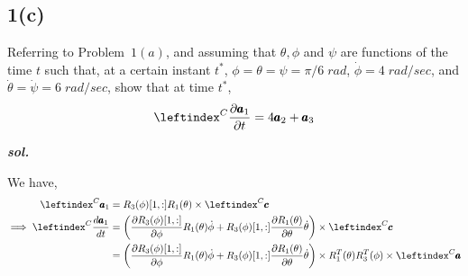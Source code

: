 \subsection{1(c)}
Referring to Problem~$1(a)$, and assuming that $\theta, \phi$ and $\psi$ are functions of the time $t$ such that, at a certain instant $t^*$, $\phi = \theta = \psi = \pi/6 \; rad$, $\dot \phi = 4 \; rad/sec$, and $\dot \theta = \dot \psi = 6 \; rad/sec$, show that at time $t^*$,
$$ \lx{^C}{\frac{\partial \pmb a_1}{\partial t}} = 4 \pmb a_2 + \pmb a_3$$

\textbf{\textit{sol.}}

We have,
\begin{align*}
    \lx{^C}{{\pmb a_1}} &= R_3(\phi)[1, :] R_1(\theta) \times \lx{^C}{\pmb c}\\
    \implies \lx{^C}{\frac{d \pmb a_1}{dt}} &= \left( \frac{\partial R_3(\phi)[1, :]}{\partial \phi}   R_1(\theta) \dot \phi + R_3(\phi)[1, :] \frac{\partial R_1(\theta)}{\partial \theta } \dot \theta \right) \times \lx{^C}{\pmb c}\\
    &= \left( \frac{\partial R_3(\phi)[1, :]}{\partial \phi}   R_1(\theta) \dot \phi + R_3(\phi)[1, :] \frac{\partial R_1(\theta)}{\partial \theta } \dot \theta \right) \times R_1^T(\theta) R_3^T(\phi) \times \lx{^C}{\pmb a}
\end{align*}

